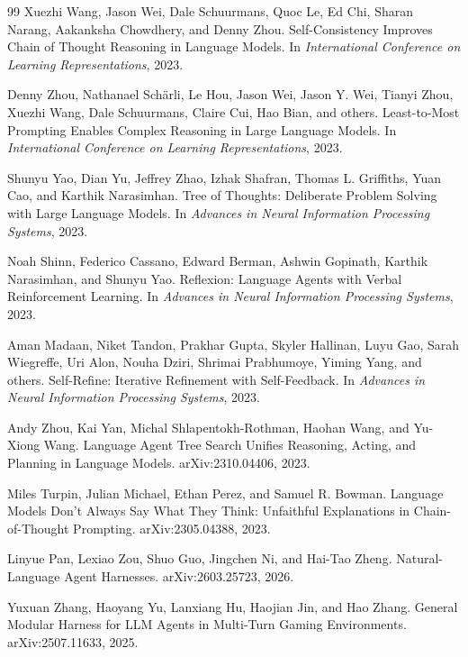 \documentclass{article}
\begin{document}
\begin{thebibliography}{99}
Xuezhi Wang, Jason Wei, Dale Schuurmans, Quoc Le, Ed Chi, Sharan Narang, Aakanksha Chowdhery, and Denny Zhou.
\newblock Self-Consistency Improves Chain of Thought Reasoning in Language Models.
\newblock In \emph{International Conference on Learning Representations}, 2023.

Denny Zhou, Nathanael Sch\"arli, Le Hou, Jason Wei, Jason Y. Wei, Tianyi Zhou, Xuezhi Wang, Dale Schuurmans, Claire Cui, Hao Bian, and others.
\newblock Least-to-Most Prompting Enables Complex Reasoning in Large Language Models.
\newblock In \emph{International Conference on Learning Representations}, 2023.

Shunyu Yao, Dian Yu, Jeffrey Zhao, Izhak Shafran, Thomas L. Griffiths, Yuan Cao, and Karthik Narasimhan.
\newblock Tree of Thoughts: Deliberate Problem Solving with Large Language Models.
\newblock In \emph{Advances in Neural Information Processing Systems}, 2023.

Noah Shinn, Federico Cassano, Edward Berman, Ashwin Gopinath, Karthik Narasimhan, and Shunyu Yao.
\newblock Reflexion: Language Agents with Verbal Reinforcement Learning.
\newblock In \emph{Advances in Neural Information Processing Systems}, 2023.

Aman Madaan, Niket Tandon, Prakhar Gupta, Skyler Hallinan, Luyu Gao, Sarah Wiegreffe, Uri Alon, Nouha Dziri, Shrimai Prabhumoye, Yiming Yang, and others.
\newblock Self-Refine: Iterative Refinement with Self-Feedback.
\newblock In \emph{Advances in Neural Information Processing Systems}, 2023.

Andy Zhou, Kai Yan, Michal Shlapentokh-Rothman, Haohan Wang, and Yu-Xiong Wang.
\newblock Language Agent Tree Search Unifies Reasoning, Acting, and Planning in Language Models.
\newblock arXiv:2310.04406, 2023.

Miles Turpin, Julian Michael, Ethan Perez, and Samuel R. Bowman.
\newblock Language Models Don't Always Say What They Think: Unfaithful Explanations in Chain-of-Thought Prompting.
\newblock arXiv:2305.04388, 2023.

Linyue Pan, Lexiao Zou, Shuo Guo, Jingchen Ni, and Hai-Tao Zheng.
\newblock Natural-Language Agent Harnesses.
\newblock arXiv:2603.25723, 2026.

Yuxuan Zhang, Haoyang Yu, Lanxiang Hu, Haojian Jin, and Hao Zhang.
\newblock General Modular Harness for LLM Agents in Multi-Turn Gaming Environments.
\newblock arXiv:2507.11633, 2025.


\end{thebibliography}
\end{document}
